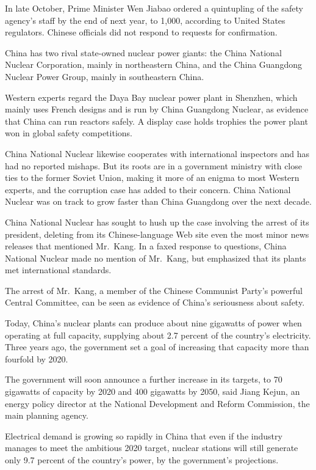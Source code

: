 ﻿\documentclass[12pt]{article}
\begin{document}
In late October, Prime Minister Wen Jiabao ordered a quintupling of the safety agency's staff by the
end of next year, to 1,000, according to United States regulators. Chinese officials did not respond
to requests for confirmation.

China has two rival state-owned nuclear power giants: the China National Nuclear Corporation, mainly
in northeastern China, and the China Guangdong Nuclear Power Group, mainly in southeastern China.

Western experts regard the Daya Bay nuclear power plant in Shenzhen, which mainly uses French
designs and is run by China Guangdong Nuclear, as evidence that China can run reactors safely. A
display case holds trophies the power plant won in global safety competitions.

China National Nuclear likewise cooperates with international inspectors and has had no reported
mishaps. But its roots are in a government ministry with close ties to the former Soviet Union,
making it more of an enigma to most Western experts, and the corruption case has added to their
concern. China National Nuclear was on track to grow faster than China Guangdong over the next
decade.

China National Nuclear has sought to hush up the case involving the arrest of its president,
deleting from its Chinese-language Web site even the most minor news releases that mentioned
Mr.~Kang. In a faxed response to questions, China National Nuclear made no mention of Mr.~Kang, but
emphasized that its plants met international standards.

The arrest of Mr.~Kang, a member of the Chinese Communist Party's powerful Central Committee, can be
seen as evidence of China's seriousness about safety.

Today, China's nuclear plants can produce about nine gigawatts of power when operating at full
capacity, supplying about 2.7 percent of the country's electricity. Three years ago, the government
set a goal of increasing that capacity more than fourfold by 2020.

The government will soon announce a further increase in its targets, to 70 gigawatts of capacity by
2020 and 400 gigawatts by 2050, said Jiang Kejun, an energy policy director at the National
Development and Reform Commission, the main planning agency.

Electrical demand is growing so rapidly in China that even if the industry manages to meet the
ambitious 2020 target, nuclear stations will still generate only 9.7 percent of the country's power,
by the government's projections.
\end{document}
